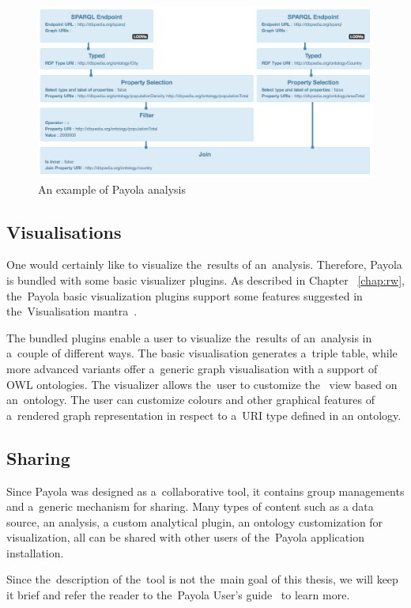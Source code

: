 \begin{figure}
	\centering
	\includegraphics[width=150mm]{images/example-analysis.png}
	\caption{An example of Payola analysis}
	\label{fig:example-analysis}
\end{figure}

\subsection{Visualisations}
One would certainly like to visualize the~results of an~analysis. Therefore, 
Payola is bundled with some basic visualizer plugins. As described
in Chapter ~\ref{chap:rw}, the~Payola basic visualization 
plugins support some features suggested in the~Visualisation 
mantra~\cite{mantra}.

The bundled plugins enable a user to visualize the~results of an~analysis 
in a~couple of different ways. The basic visualisation generates a~triple 
table, while more advanced variants offer a~generic graph visualisation with a 
support of OWL ontologies. The visualizer allows the~user to customize the~
view based on an~ontology. The user can customize colours and other graphical 
features of a~rendered graph representation in respect to a~URI type defined in 
an ontology.

\subsection{Sharing}
Since Payola was designed as a~collaborative tool, it contains group 
managements and a~generic mechanism for sharing. Many types of content such as a 
data source, an analysis, a custom analytical plugin, an ontology customization for 
visualization, all can be shared with other users of the~Payola application 
installation.

Since the~description of the~tool is not the~main goal of this thesis, we will 
keep it brief and refer the reader to the~Payola User's guide~\cite{payola-ug} to learn more.

